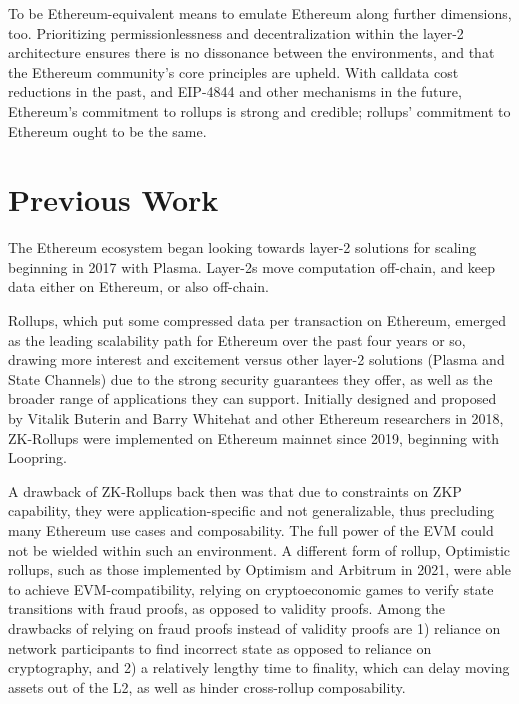 \documentclass[9pt,oneside]{amsart}
\begin{document}
\begin{multicols}{2}
To be Ethereum-equivalent means to emulate Ethereum along further dimensions, too. Prioritizing permissionlessness and decentralization within the layer-2 architecture ensures there is no dissonance between the environments, and that the Ethereum community’s core principles are upheld. With calldata cost reductions in the past\cite{eip2028}, and EIP-4844\cite{eip4844} and other mechanisms in the future, Ethereum's commitment to rollups is strong and credible; rollups' commitment to Ethereum ought to be the same.

\section{Previous Work}

The Ethereum ecosystem began looking towards layer-2 solutions for scaling beginning in 2017 with Plasma\cite{plasma}. Layer-2s move computation off-chain, and keep data either on Ethereum, or also off-chain.

Rollups, which put some compressed data per transaction on Ethereum, emerged as the leading scalability path for Ethereum over the past four years or so, drawing more interest and excitement versus other layer-2 solutions (Plasma and State Channels) due to the strong security guarantees they offer, as well as the broader range of applications they can support. Initially designed and proposed by Vitalik Buterin\cite{vitalik-rollup} and Barry Whitehat\cite{barry-rollup} and other Ethereum researchers in 2018, ZK-Rollups were implemented on Ethereum mainnet since 2019, beginning with Loopring. 

A drawback of ZK-Rollups back then was that due to constraints on ZKP capability, they were application-specific and not generalizable, thus precluding many Ethereum use cases and composability. The full power of the EVM could not be wielded within such an environment. A different form of rollup, Optimistic rollups, such as those implemented by Optimism and Arbitrum in 2021, were able to achieve EVM-compatibility, relying on cryptoeconomic games to verify state transitions with fraud proofs, as opposed to validity proofs. Among the drawbacks of relying on fraud proofs instead of validity proofs are 1) reliance on network participants to find incorrect state as opposed to reliance on cryptography, and 2) a relatively lengthy time to finality, which can delay moving assets out of the L2, as well as hinder cross-rollup composability. 


\end{multicols}
\end{document}
